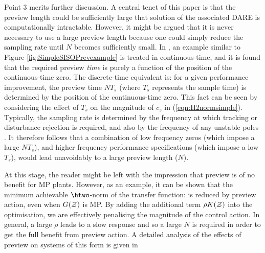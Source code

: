 Point 3 merits further discussion. A central tenet of this paper is that the preview length could be sufficiently large that solution of the associated {DARE} is computationally intractable. However, it might be argued that it is never necessary to use a large preview length because one could simply reduce the sampling rate until $N$ becomes sufficiently small.  In \cite{Middleteon_2004_PrevPerf}, an example similar to Figure \ref{fig:SimpleSISOPrevexample} is treated in continuous-time, and it is found that the required preview \textit{time} is purely a function of the position of the continuous-time zero. The discrete-time equivalent is: for a given performance improvement, the preview time $NT_s$ (where $T_s$ represents the sample time) is determined by the position of the continuous-time zero. This fact can be seen by considering the effect of $T_s$ on the magnitude of $c_z$ in (\ref{eqn:H2normsimple}). Typically, the sampling rate is determined by the frequency at which tracking or disturbance rejection is required, and also by the frequency of any unstable poles \citep{Houpis_1991_DigitalControlSystems}. It therefore follows that a combination of low frequency zeros (which impose a large $NT_s$), and higher frequency performance specifications (which impose a low $T_s$), would lead unavoidably to a large preview length ($N$).%


At this stage, the reader might be left with the impression that preview is of no benefit for {MP} plants. However, as an example, it can be shown that the minimum achievable $\htwo$-norm of the transfer function:
is reduced by preview action, even when $G(\mathcal{Z})$ is {MP}. By adding the additional term $\rho K(\mathcal{Z})$ into the optimisation,
we are effectively penalising the magnitude of the control action. In general, a large $\rho$ leads to a slow response and so a large $N$ is required in order to get the full benefit from preview action. A detailed analysis of the effects of preview on systems of this form is given in \cite[Chapter 4]{Hazell_2007_Thesis}

